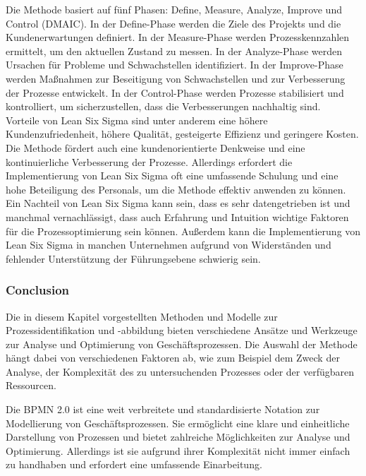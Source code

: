 \documentclass[11pt,a4paper]{scrartcl}
\begin{document}
Die Methode basiert auf fünf Phasen: Define, Measure, Analyze, Improve und Control (DMAIC).
In der Define-Phase werden die Ziele des Projekts und die Kundenerwartungen definiert.
In der Measure-Phase werden Prozesskennzahlen ermittelt, um den aktuellen Zustand zu messen.
In der Analyze-Phase werden Ursachen für Probleme und Schwachstellen identifiziert.
In der Improve-Phase werden Maßnahmen zur Beseitigung von Schwachstellen und zur Verbesserung der Prozesse entwickelt.
In der Control-Phase werden Prozesse stabilisiert und kontrolliert, um sicherzustellen, dass die Verbesserungen nachhaltig sind.\\

Vorteile von Lean Six Sigma sind unter anderem eine höhere Kundenzufriedenheit, höhere Qualität, gesteigerte Effizienz und geringere Kosten.
Die Methode fördert auch eine kundenorientierte Denkweise und eine kontinuierliche Verbesserung der Prozesse.
Allerdings erfordert die Implementierung von Lean Six Sigma oft eine umfassende Schulung und eine hohe Beteiligung des Personals, um die Methode effektiv anwenden zu können.\\

Ein Nachteil von Lean Six Sigma kann sein, dass es sehr datengetrieben ist und manchmal vernachlässigt, dass auch Erfahrung und Intuition wichtige Faktoren für die Prozessoptimierung sein können.
Außerdem kann die Implementierung von Lean Six Sigma in manchen Unternehmen aufgrund von Widerständen und fehlender Unterstützung der Führungsebene schwierig sein.\\

\subsubsection{Conclusion}

Die in diesem Kapitel vorgestellten Methoden und Modelle zur Prozessidentifikation und -abbildung bieten verschiedene Ansätze und Werkzeuge zur Analyse und Optimierung von Geschäftsprozessen. Die Auswahl der Methode hängt dabei von verschiedenen Faktoren ab, wie zum Beispiel dem Zweck der Analyse, der Komplexität des zu untersuchenden Prozesses oder der verfügbaren Ressourcen.

Die BPMN 2.0 ist eine weit verbreitete und standardisierte Notation zur Modellierung von Geschäftsprozessen. Sie ermöglicht eine klare und einheitliche Darstellung von Prozessen und bietet zahlreiche Möglichkeiten zur Analyse und Optimierung. Allerdings ist sie aufgrund ihrer Komplexität nicht immer einfach zu handhaben und erfordert eine umfassende Einarbeitung.
\end{document}
